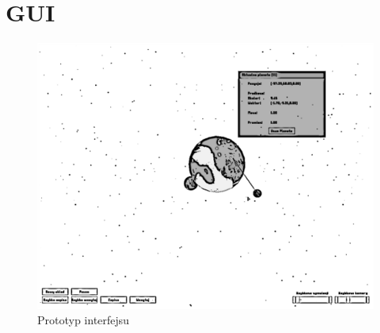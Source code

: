 \section{GUI}\label{sec:gui}

\begin{figure}[h]
	\centering
	\includegraphics[width=1.0\textwidth]{gui.png}
	\caption{Prototyp interfejsu}
	\label{fig:gui}
\end{figure}

